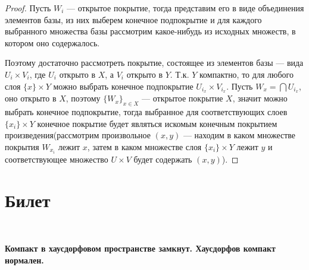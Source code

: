 \documentclass[a4paper,100pt]{article}
\theoremstyle{indented}
\begin{document}
    \begin{proof}
        Пусть $W_i$ --- открытое покрытие, тогда представим его в виде объединения элементов базы, из них выберем конечное подпокрытие и для каждого выбранного множества базы рассмотрим какое-нибудь из исходных множеств, в котором оно содержалось.
        
        Поэтому достаточно рассмотреть покрытие, состоящее из элементов базы --- вида $U_i \times V_i$, где $U_i$ открыто в $X$, а $V_i$ открыто в $Y$. Т.к. $Y$ компактно, то для любого слоя $\{x\} \times Y$ можно выбрать конечное подпокрытие $U_{i_x} \times V_{i_x}$. Пусть $W_x = \bigcap U_{i_x}$, оно открыто в $X$, поэтому $\{W_x\}_{x \in X}$ --- открытое покрытие $X$, значит можно выбрать конечное подпокрытие, тогда выбранное для соответствующих слоев $\{x_i\} \times Y$ конечное покрытие будет являться искомым конечным покрытием произведения(рассмотрим произвольное $(x,y)$ --- находим в каком множестве покрытия $W_{x_i}$ лежит $x$, затем в каком множестве слоя $\{x_i\} \times Y$ лежит $y$ и соответствующее множество $U \times V$ будет содержать $(x,y)$).  
    \end{proof}

\section{Билет} \

\medskip

\textbf{Компакт в хаусдорфовом пространстве замкнут. Хаусдорфов компакт нормален.}\\
\end{document}
